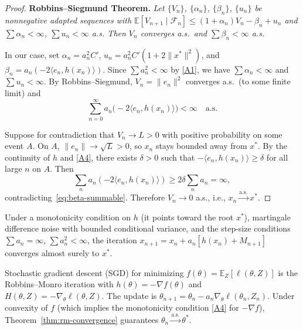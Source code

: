\documentclass[11pt,a4paper]{article}
\theoremstyle{definition}
\theoremstyle{plain}
\theoremstyle{remark}
\newcommand{\E}{\mathbb{E}}
\newcommand{\cas}{\xrightarrow{\text{a.s.}}}
\begin{document}
\begin{proof}
\medskip\noindent
\textbf{Robbins--Siegmund Theorem.} \emph{Let $\{V_n\}$, $\{\alpha_n\}$,
$\{\beta_n\}$, $\{u_n\}$ be nonneg\-a\-tive adapted sequences with
$\E[V_{n+1} \mid \mathcal{F}_n] \leq (1+\alpha_n)V_n - \beta_n + u_n$ and
$\sum \alpha_n < \infty$, $\sum u_n < \infty$ a.s. Then $V_n$ converges a.s.\ and
$\sum \beta_n < \infty$ a.s.}

\medskip
In our case, set $\alpha_n = a_n^2 C'$, $u_n = a_n^2 C'(1 + 2\|x^*\|^2)$, and
$\beta_n = a_n(-2\langle e_n, h(x_n)\rangle)$. Since $\sum a_n^2 < \infty$ by
\ref{A1}, we have $\sum \alpha_n < \infty$ and $\sum u_n < \infty$. By
Robbins--Siegmund, $V_n = \|e_n\|^2$ converges a.s.\ (to some finite limit) and
\begin{equation}
\label{eq:beta-summable}
  \sum_{n=0}^{\infty} a_n \bigl(-2\langle e_n, h(x_n)\rangle\bigr) < \infty
  \quad \text{a.s.}
\end{equation}

Suppose for contradiction that $V_n \to L > 0$ with positive probability on some
event $A$. On $A$, $\|e_n\| \to \sqrt{L} > 0$, so $x_n$ stays bounded away from
$x^*$. By the continuity of $h$ and \ref{A4}, there exists $\delta > 0$ such that
$-\langle e_n, h(x_n)\rangle \geq \delta$ for all large $n$ on $A$. Then
\[
  \sum_{n} a_n (-2\langle e_n, h(x_n)\rangle) \geq 2\delta \sum_n a_n = \infty,
\]
contradicting~\eqref{eq:beta-summable}. Therefore $V_n \to 0$ a.s., i.e.,
$x_n \cas x^*$.
\end{proof}

\begin{keyresult}
Under a monotonicity condition on $h$ (it points toward the root $x^*$),
martingale difference noise with bounded conditional variance, and the step-size
conditions $\sum a_n = \infty$, $\sum a_n^2 < \infty$, the iteration
$x_{n+1} = x_n + a_n[h(x_n) + M_{n+1}]$ converges almost surely to $x^*$.
\end{keyresult}

\begin{rlconnection}
Stochastic gradient descent (SGD) for minimizing $f(\theta) = \E_Z[\ell(\theta, Z)]$
is the Robbins--Monro iteration with $h(\theta) = -\nabla f(\theta)$ and
$H(\theta, Z) = -\nabla_\theta \ell(\theta, Z)$. The update is
$\theta_{n+1} = \theta_n - a_n \nabla_\theta \ell(\theta_n, Z_n)$. Under
convexity of $f$ (which implies the monotonicity condition \ref{A4} for $-\nabla f$),
Theorem~\ref{thm:rm-convergence} guarantees $\theta_n \cas \theta^*$.
\end{rlconnection}
\end{document}
